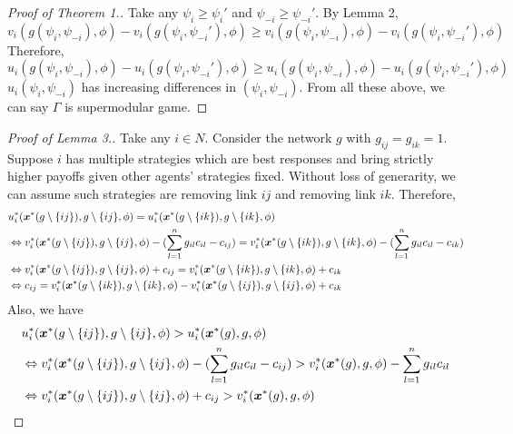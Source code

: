 \documentclass[12pt]{article}
\theoremstyle{definition}
\newcommand{\bm}[1]{\boldsymbol{#1}}
\begin{document}
\begin{proof}[Proof of Theorem 1.]
	Take any $\psi_i \ge \psi_i'$ and $\psi_{-i} \ge \psi_{-i}'$.
	By Lemma 2,
	\[ v_i(g(\psi_i, \psi_{-i}), \phi) - v_i(g(\psi_i, \psi_{-i}'),\phi) \ge v_i(g(\psi_i, \psi_{-i}), \phi) - v_i(g(\psi_i, \psi_{-i}'),\phi) \]
	Therefore,
	\[ u_i(g(\psi_i, \psi_{-i}), \phi) - u_i(g(\psi_i, \psi_{-i}'),\phi) \ge u_i(g(\psi_i, \psi_{-i}), \phi) - u_i(g(\psi_i, \psi_{-i}'),\phi) \]
	$u_i(\psi_i, \psi_{-i})$ has increasing differences in $(\psi_i, \psi_{-i})$.
	From all these above, we can say $\Gamma$ is supermodular game.
\end{proof}

\begin{proof}[Proof of Lemma 3.]
	Take any $i \in N$.
	Consider the network $g$ with $g_{ij} = g_{ik} = 1$.
	Suppose $i$ has multiple strategies which are best responses and bring strictly higher payoffs given other agents' strategies fixed.
	Without loss of generarity, we can assume such strategies are removing link $ij$ and removing link $ik$.
	Therefore,
	\begin{align}
		\label{lemma3-1}
		& u_i^*(\bm{x}^*(g \setminus \{ij\}), g \setminus \{ij\}, \phi) = u_i^*(\bm{x}^*(g \setminus \{ik\}), g \setminus \{ik\}, \phi) \notag \\
			& \Leftrightarrow v_i^*(\bm{x}^*(g \setminus \{ij\}), g \setminus \{ij\}, \phi) - (\sum_{l=1}^n g_{il} c_{il} - c_{ij}) = v_i^*(\bm{x}^*(g \setminus \{ik\}), g \setminus \{ik\}, \phi) - (\sum_{l=1}^n g_{il} c_{il} - c_{ik}) \notag \\
			& \Leftrightarrow v_i^*(\bm{x}^*(g \setminus \{ij\}), g \setminus \{ij\}, \phi) + c_{ij} = v_i^*(\bm{x}^*(g \setminus \{ik\}), g \setminus \{ik\}, \phi) + c_{ik} \notag \\
			& \Leftrightarrow c_{ij} = v_i^*(\bm{x}^*(g \setminus \{ik\}), g \setminus \{ik\}, \phi) - v_i^*(\bm{x}^*(g \setminus \{ij\}), g \setminus \{ij\}, \phi) + c_{ik}
	\end{align}
	Also, we have
	\begin{align}
		\label{lemma3-2}
		& u_i^*(\bm{x}^*(g \setminus \{ij\}), g \setminus \{ij\}, \phi) > u_i^*(\bm{x}^*(g), g, \phi) \notag \\
			& \Leftrightarrow v_i^*(\bm{x}^*(g \setminus \{ij\}), g \setminus \{ij\}, \phi) - (\sum_{l=1}^n g_{il} c_{il} - c_{ij}) > v_i^*(\bm{x}^*(g), g, \phi) - \sum_{l=1}^n g_{il} c_{il} \notag \\
			& \Leftrightarrow v_i^*(\bm{x}^*(g \setminus \{ij\}), g \setminus \{ij\}, \phi) + c_{ij} > v_i^*(\bm{x}^*(g), g, \phi) \notag \\

\end{align}
\end{proof}
\end{document}
